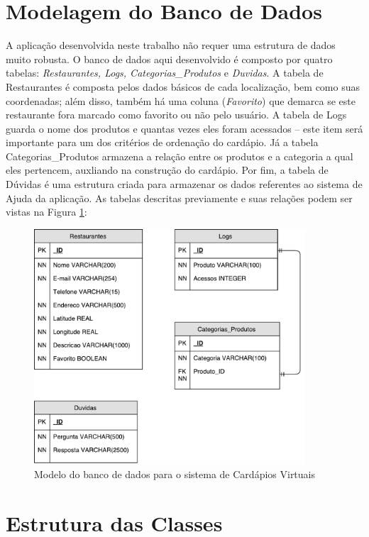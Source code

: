 \section{Modelagem do Banco de Dados}

A aplicação desenvolvida neste trabalho não requer uma estrutura de dados muito robusta. O banco de dados aqui desenvolvido é composto por quatro tabelas: \emph{Restaurantes, Logs, Categorias\_Produtos} e \emph{Duvidas}. A tabela de Restaurantes é composta pelos dados básicos de cada localização, bem como suas coordenadas; além disso, também há uma coluna (\emph{Favorito}) que demarca se este restaurante fora marcado como favorito ou não pelo usuário. A tabela de Logs guarda o nome dos produtos e quantas vezes eles foram acessados -- este item será importante para um dos critérios de ordenação do cardápio. Já a tabela Categorias\_Produtos armazena a relação entre os produtos e a categoria a qual eles pertencem, auxliando na construção do cardápio. Por fim, a tabela de Dúvidas é uma estrutura criada para armazenar os dados referentes ao sistema de Ajuda da aplicação. As tabelas descritas previamente e suas relações podem ser vistas na Figura \ref{fig:bd}:

\begin{figure}[H]
	\centering
	\caption[Modelagem do Banco de Dados]{\label{fig:bd}Modelo do banco de dados para o sistema de Cardápios Virtuais}
	\includegraphics[width=0.9\textwidth]{./pdf/bd.pdf}
\end{figure}

\section{Estrutura das Classes}
